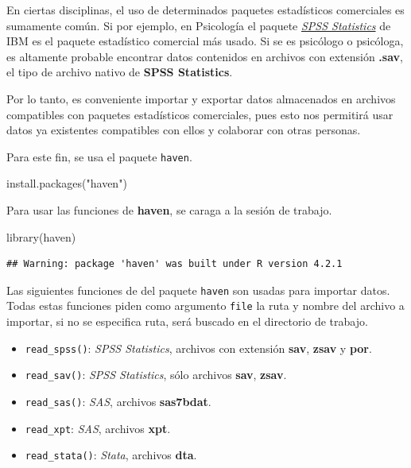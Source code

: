 \documentclass[
]{book}
\newenvironment{Shaded}{\begin{snugshade}}{\end{snugshade}}
\newcommand{\FunctionTok}[1]{\textcolor[rgb]{0.00,0.00,0.00}{#1}}
\newcommand{\NormalTok}[1]{#1}
\newcommand{\StringTok}[1]{\textcolor[rgb]{0.31,0.60,0.02}{#1}}
\providecommand{\tightlist}{%
  \setlength{\itemsep}{0pt}\setlength{\parskip}{0pt}}
\begin{document}
En ciertas disciplinas, el uso de determinados paquetes estadísticos comerciales es sumamente común. Si por ejemplo, en Psicología el paquete \href{https://www.ibm.com/products/spss-statistics}{\emph{SPSS Statistics}} de IBM es el paquete estadístico comercial más usado. Si se es psicólogo o psicóloga, es altamente probable encontrar datos contenidos en archivos con extensión \textbf{.sav}, el tipo de archivo nativo de \textbf{SPSS Statistics}.

Por lo tanto, es conveniente importar y exportar datos almacenados en archivos compatibles con paquetes estadísticos comerciales, pues esto nos permitirá usar datos ya existentes compatibles con ellos y colaborar con otras personas.

Para este fin, se usa el paquete \texttt{haven}.

\begin{Shaded}
\begin{Highlighting}[]
\FunctionTok{install.packages}\NormalTok{(}\StringTok{"haven"}\NormalTok{)}
\end{Highlighting}
\end{Shaded}

Para usar las funciones de \textbf{haven}, se caraga a la sesión de trabajo.

\begin{Shaded}
\begin{Highlighting}[]
\FunctionTok{library}\NormalTok{(haven)}
\end{Highlighting}
\end{Shaded}

\begin{verbatim}
## Warning: package 'haven' was built under R version 4.2.1
\end{verbatim}

Las siguientes funciones de del paquete \texttt{haven} son usadas para importar datos. Todas estas funciones piden como argumento \texttt{file} la ruta y nombre del archivo a importar, si no se especifica ruta, será buscado en el directorio de trabajo.

\begin{itemize}
\tightlist
\item
  \texttt{read\_spss()}: \emph{SPSS Statistics}, archivos con extensión \textbf{sav}, \textbf{zsav} y \textbf{por}.
\item
  \texttt{read\_sav()}: \emph{SPSS Statistics}, sólo archivos \textbf{sav}, \textbf{zsav}.
\item
  \texttt{read\_sas()}: \emph{SAS}, archivos \textbf{sas7bdat}.
\item
  \texttt{read\_xpt}: \emph{SAS}, archivos \textbf{xpt}.
\item
  \texttt{read\_stata()}: \emph{Stata}, archivos \textbf{dta}.
\end{itemize}
\end{document}
